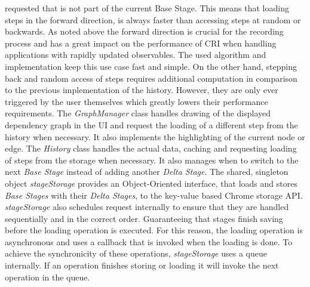 requested that is not part of the current Base Stage. This means that loading steps in the forward direction, is always faster than accessing steps at random or backwards. As noted above the forward direction is crucial for the recording process and has a great impact on the performance of CRI when handling applications with rapidly updated observables. The used algorithm and implementation keep this use case fast and simple. On the other hand, stepping back and random access of steps requires additional computation in comparison to the previous implementation of the history. However, they are only ever triggered by the user themselves which greatly lowers their performance requirements.
The \emph{GraphManager} class handles drawing of the displayed dependency graph in the UI and request the loading of a different step from the history when necessary. It also implements the highlighting of the current node or edge. The \emph{History} class handles the actual data, caching and requesting loading of steps from the storage when necessary. It also manages when to switch to the next \emph{Base Stage} instead of adding another \emph{Delta Stage}. The shared, singleton object \emph{stageStorage} provides an Object-Oriented interface, that loads and stores \emph{Base Stages} with their \emph{Delta Stages}, to the key-value based Chrome storage API. \emph{stageStorage} also schedules request internally to ensure that they are handled sequentially and in the correct order. Guaranteeing that stages finish saving before the loading operation is executed. For this reason, the loading operation is asynchronous and uses a callback that is invoked when the loading is done. To achieve the synchronicity of these operations, \emph{stageStorage} uses a queue internally. If an operation finishes storing or loading it will invoke the next operation in the queue.	
	
